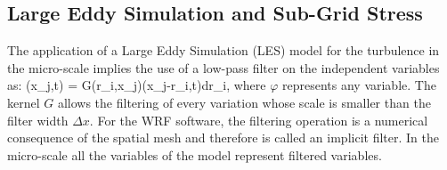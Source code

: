 \subsection{Large Eddy Simulation and Sub-Grid Stress}
The application of a Large Eddy Simulation (LES) model for the turbulence in the micro-scale implies the use of a low-pass filter on the independent variables as:
\be
\widetilde{\varphi}(x_j,t) = \int \!G(r_i,x_j)\varphi(x_j-r_i,t)dr_i,
\ee
where $\varphi$ represents any variable. The kernel $G$ allows the filtering of every variation whose scale is smaller than the filter width $\Delta x$. For the WRF software, the filtering operation is a numerical consequence of the spatial mesh and therefore is called an implicit filter. In the micro-scale all the variables of the model represent filtered variables.

